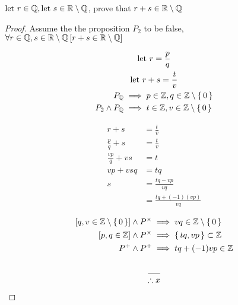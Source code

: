 \question ${\text{let } } r \in {\mathbb Q}, {\text{let } } s \in {\mathbb R}\setminus{\mathbb Q}$, prove that $r+s \in {\mathbb R}\setminus{\mathbb Q}$

\begin{proof}
	Assume the the proposition $P_2$ to be false, $\forall r \in {\mathbb Q}, s \in {\mathbb R}\setminus{\mathbb Q} \,{ \left[ {r+s \in {\mathbb R}\setminus{\mathbb Q}} \right] }$

	\begin{gather*}
		{\text{let } } r  = \frac{p}{q} \\
		{\text{let } } r+s = \frac{t}{v} \\
		\begin{split}
			P_{{\mathbb Q}}            & \implies p \in {\mathbb Z}, q \in {\mathbb Z}\setminus\set{0}  \\
			P_2 \wedge P_{{\mathbb Q}} & \implies  t \in {\mathbb Z}, v \in {\mathbb Z}\setminus\set{0}
		\end{split}
	\end{gather*}

	\begin{align*}
		r + s             & = \frac{t}{v}               \\
		\frac{p}{q} + s   & = \frac{t}{v}               \\
		\frac{vp}{q} + vs & = t                         \\
		vp + vsq          & = tq                        \\
		s                 & = \frac{tq-vp}{vq}          \\
		                  & = \frac{tq + (-1)(vp) }{vq}
	\end{align*}

	\begin{align*}
		{ \left[ {q,v \in {\mathbb Z}\setminus \set{0} } \right] } \wedge P^{\times} & \implies vq \in {\mathbb Z} \setminus \set{0} \\
		{ \left[ {p,q\in {\mathbb Z}} \right] } \wedge P^{\times}                     & \implies \set{tq, vp} \subset {\mathbb Z}     \\
		P^{+} \wedge P^{+}                                   & \implies tq+(-1)vp \in {\mathbb Z}            \\
	\end{align*}
	\begin{equation*}
		\begin{split}
			 &     \\[1ex]
			\hline \\[-3ex]
			\therefore x
		\end{split}
	\end{equation*}


\end{proof}
